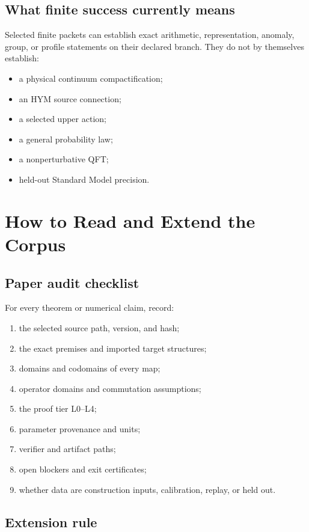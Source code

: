 \documentclass[11pt]{article}
\begin{document}
\subsection{What finite success currently means}

Selected finite packets can establish exact arithmetic, representation,
anomaly, group, or profile statements on their declared branch.  They do not
by themselves establish:
\begin{itemize}
\item a physical continuum compactification;
\item an HYM source connection;
\item a selected upper action;
\item a general probability law;
\item a nonperturbative QFT;
\item held-out Standard Model precision.
\end{itemize}

\section{How to Read and Extend the Corpus}

\subsection{Paper audit checklist}

For every theorem or numerical claim, record:
\begin{enumerate}[label=\arabic*.]
\item the selected source path, version, and hash;
\item the exact premises and imported target structures;
\item domains and codomains of every map;
\item operator domains and commutation assumptions;
\item the proof tier L0--L4;
\item parameter provenance and units;
\item verifier and artifact paths;
\item open blockers and exit certificates;
\item whether data are construction inputs, calibration, replay, or held out.
\end{enumerate}

\subsection{Extension rule}
\end{document}
